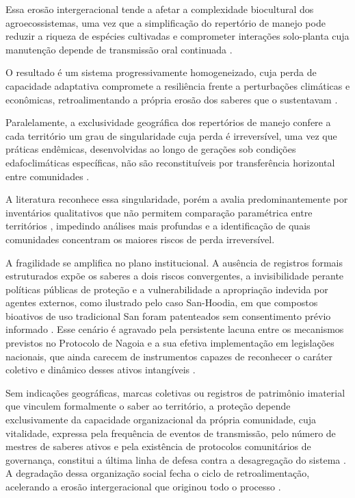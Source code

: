 \documentclass[12pt,a4paper]{article}
\begin{document}
Essa erosão intergeracional tende a afetar a complexidade biocultural dos agroecossistemas, uma vez que a simplificação do repertório de manejo pode reduzir a riqueza de espécies cultivadas e comprometer interações solo-planta cuja manutenção depende de transmissão oral continuada \citep{Brush2004,Jarvis2008,Bastos2022}. 

O resultado é um sistema progressivamente homogeneizado, cuja perda de capacidade adaptativa compromete a resiliência frente a perturbações climáticas e econômicas, retroalimentando a própria erosão dos saberes que o sustentavam \citep{Tran2025,Aniah2019}.

Paralelamente, a exclusividade geográfica dos repertórios de manejo confere a cada território um grau de singularidade cuja perda é irreversível, uma vez que práticas endêmicas, desenvolvidas ao longo de gerações sob condições edafoclimáticas específicas, não são reconstituíveis por transferência horizontal entre comunidades \citep{Laborde2023,Ens2016}. 

A literatura reconhece essa singularidade, porém a avalia predominantemente por inventários qualitativos que não permitem comparação paramétrica entre territórios \citep{CalvetMir2016,LaRosa2021,Saiba2023}, impedindo análises mais profundas e a identificação de quais comunidades concentram os maiores riscos de perda irreversível.

A fragilidade se amplifica no plano institucional. A ausência de registros formais estruturados expõe os saberes a dois riscos convergentes, a invisibilidade perante políticas públicas de proteção \citep{Santilli2009} e a vulnerabilidade a apropriação indevida por agentes externos, como ilustrado pelo caso San-Hoodia, em que compostos bioativos de uso tradicional San foram patenteados sem consentimento prévio informado \citep{Wynberg2015}. Esse cenário é agravado pela persistente lacuna entre os mecanismos previstos no Protocolo de Nagoia e a sua efetiva implementação em legislações nacionais, que ainda carecem de instrumentos capazes de reconhecer o caráter coletivo e dinâmico desses ativos intangíveis \citep{Laird2020}.

Sem indicações geográficas, marcas coletivas ou registros de patrimônio imaterial que vinculem formalmente o saber ao território, a proteção depende exclusivamente da capacidade organizacional da própria comunidade, cuja vitalidade, expressa pela frequência de eventos de transmissão, pelo número de mestres de saberes ativos e pela existência de protocolos comunitários de governança, constitui a última linha de defesa contra a desagregação do sistema \citep{FalsBorda1991,Ostrom1990}. A degradação dessa organização social fecha o ciclo de retroalimentação, acelerando a erosão intergeracional que originou todo o processo \citep{Agrawal2002}.
\end{document}
